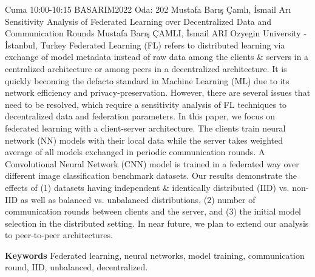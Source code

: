 
    \begin{abstract_basarim}
    {Cuma 10:00-10:15}
    {BASARIM2022}
    {Oda: 202}
    {Mustafa Barış Çamlı, İsmail Arı}
    {Sensitivity Analysis of Federated Learning over Decentralized Data and Communication Rounds}
    {%
    Mustafa Barış ÇAMLI, İsmail ARI}
    {%
    }
    {%
    Ozyegin University - İstanbul, Turkey}
    Federated Learning (FL) refers to distributed learning via exchange of model metadata instead of raw data among the clients & servers in a centralized architecture or among peers in a decentralized architecture. It is quickly becoming the defacto standard in Machine Learning (ML) due to its network efficiency and privacy-preservation. However, there are several issues that need to be resolved, which require a sensitivity analysis of FL techniques to decentralized data and federation parameters. In this paper, we focus on federated learning with a client-server architecture. The clients train neural network (NN) models with their local data while the server takes weighted average of all models exchanged in periodic communication rounds. A Convolutional Neural Network (CNN) model is trained in a federated way over different image classification benchmark datasets. Our results demonstrate the effects of (1) datasets having independent & identically distributed (IID) vs. non-IID as well as balanced vs. unbalanced distributions, (2) number of communication rounds between clients and the server, and (3) the initial model selection in the distributed setting. In near future, we plan to extend our analysis to peer-to-peer architectures. 
    
        \textbf{Keywords} \newline{}Federated learning, neural networks, model training, communication round, IID, unbalanced, decentralized.
    \end{abstract_basarim}
    